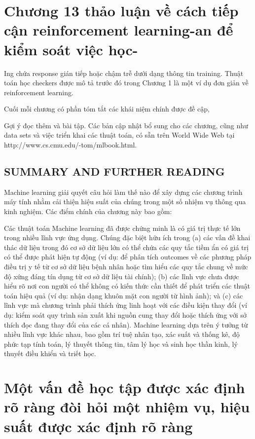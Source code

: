\section{Chương 13 thảo luận về cách tiếp cận reinforcement learning-an để kiểm soát việc học-}

Ing chứa response gián tiếp hoặc chậm trễ dưới dạng thông tin training. Thuật toán học checkers được mô tả trước đó trong Chương 1 là một ví dụ đơn giản về reinforcement learning.

Cuối mỗi chương có phần tóm tắt các khái niệm chính được đề cập,

Gợi ý đọc thêm và bài tập. Các bản cập nhật bổ sung cho các chương, cũng như data sets và việc triển khai các thuật toán, có sẵn trên World Wide Web tại http://www.cs.cmu.edu/-tom/mlbook.html.

\subsection{SUMMARY AND FURTHER READING}

Machine learning giải quyết câu hỏi làm thế nào để xây dựng các chương trình máy tính nhằm cải thiện hiệu suất của chúng trong một số nhiệm vụ thông qua kinh nghiệm. Các điểm chính của chương này bao gồm:

Các thuật toán Machine learning đã được chứng minh là có giá trị thực tế lớn trong nhiều lĩnh vực ứng dụng. Chúng đặc biệt hữu ích trong (a) các vấn đề khai thác dữ liệu trong đó cơ sở dữ liệu lớn có thể chứa các quy tắc tiềm ẩn có giá trị có thể được phát hiện tự động (ví dụ: để phân tích outcomes về các phương pháp điều trị y tế từ cơ sở dữ liệu bệnh nhân hoặc tìm hiểu các quy tắc chung về mức độ xứng đáng tín dụng từ cơ sở dữ liệu tài chính); (b) các lĩnh vực chưa được hiểu rõ nơi con người có thể không có kiến ​​thức cần thiết để phát triển các thuật toán hiệu quả (ví dụ: nhận dạng khuôn mặt con người từ hình ảnh); và (c) các lĩnh vực mà chương trình phải thích ứng linh hoạt với các điều kiện thay đổi (ví dụ: kiểm soát quy trình sản xuất khi nguồn cung thay đổi hoặc thích ứng với sở thích đọc đang thay đổi của các cá nhân). Machine learning dựa trên ý tưởng từ nhiều lĩnh vực khác nhau, bao gồm trí tuệ nhân tạo, xác suất và thống kê, độ phức tạp tính toán, lý thuyết thông tin, tâm lý học và sinh học thần kinh, lý thuyết điều khiển và triết học.

\section{Một vấn đề học tập được xác định rõ ràng đòi hỏi một nhiệm vụ, hiệu suất được xác định rõ ràng}

